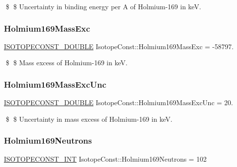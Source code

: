 \$ \$ Uncertainty in binding energy per A of Holmium-\/169 in keV. \mbox{\label{group___isotope_const-_holmium-_ho169_gaa340b5b6aa8e81d8b1c5e652e0fc1491}} 
\subsubsection{\texorpdfstring{Holmium169\+Mass\+Exc}{Holmium169MassExc}}
{\footnotesize\ttfamily \mbox{\hyperlink{group___isotope_const-_macros_ga8f45a7272ce02c0b4c65c44636ed719a}{I\+S\+O\+T\+O\+P\+E\+C\+O\+N\+S\+T\+\_\+\+D\+O\+U\+B\+LE}} Isotope\+Const\+::\+Holmium169\+Mass\+Exc = -\/58797.}

\$ \$ Mass excess of Holmium-\/169 in keV. \mbox{\label{group___isotope_const-_holmium-_ho169_gaf1645f8208c6405e1dffa69fa501bab4}} 
\subsubsection{\texorpdfstring{Holmium169\+Mass\+Exc\+Unc}{Holmium169MassExcUnc}}
{\footnotesize\ttfamily \mbox{\hyperlink{group___isotope_const-_macros_ga8f45a7272ce02c0b4c65c44636ed719a}{I\+S\+O\+T\+O\+P\+E\+C\+O\+N\+S\+T\+\_\+\+D\+O\+U\+B\+LE}} Isotope\+Const\+::\+Holmium169\+Mass\+Exc\+Unc = 20.}

\$ \$ Uncertainty in mass excess of Holmium-\/169 in keV. \mbox{\label{group___isotope_const-_holmium-_ho169_ga0b76776d3480a4440ce12cb0b65c6b0c}} 
\subsubsection{\texorpdfstring{Holmium169\+Neutrons}{Holmium169Neutrons}}
{\footnotesize\ttfamily \mbox{\hyperlink{group___isotope_const-_macros_ga5f18360b3e99483a35c32d789e62621c}{I\+S\+O\+T\+O\+P\+E\+C\+O\+N\+S\+T\+\_\+\+I\+NT}} Isotope\+Const\+::\+Holmium169\+Neutrons = 102}


